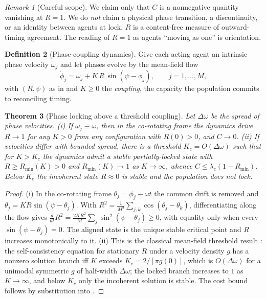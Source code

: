 \documentclass[11pt,a4paper]{article}
\theoremstyle{clstyle}
\newtheorem{theorem}{Theorem}[section]
\theoremstyle{definition}
\newtheorem{definition}[theorem]{Definition}
\theoremstyle{remark}
\newtheorem{remark}[theorem]{Remark}
\newcommand{\Ord}{R}
\newcommand{\Kc}{K_{c}}
\begin{document}
\begin{remark}[Careful scope]
\label{rem:phaselock-scope}
We claim only that $C$ is a nonnegative quantity vanishing at $\Ord=1$. We
do \emph{not} claim a physical phase transition, a discontinuity, or an
identity between agents at lock. $\Ord$ is a content-free measure of
outward-timing agreement. The reading of $\Ord=1$ as agents ``moving as one''
is orientation.
\end{remark}

\begin{definition}[Phase-coupling dynamics]
\label{def:kuramoto}
Give each acting agent an intrinsic phase velocity $\omega_j$ and let phases
evolve by the mean-field flow \citep{kuramoto1984chemical}
\[
\dot\phi_j=\omega_j+K\,\Ord\,\sin(\psi-\phi_j),\qquad j=1,\dots,M,
\]
with $(\Ord,\psi)$ as in  and $K\ge0$ the \emph{coupling},
the capacity the population commits to reconciling timing.
\end{definition}

\begin{theorem}[Phase locking above a threshold coupling]
\label{thm:kuramoto}
Let $\Delta\omega$ be the spread of phase velocities.
\textup{(i)} If $\omega_j\equiv\omega$, then in the co-rotating frame the
dynamics drive $\Ord\to1$ for any $K>0$ from any configuration with
$\Ord(0)>0$, and $C\to0$.
\textup{(ii)} If velocities differ with bounded spread, there is a threshold
$\Kc=O(\Delta\omega)$ such that for $K>\Kc$ the dynamics admit a stable
partially-locked state with $\Ord\ge\Ord_{\min}(K)>0$ and
$\Ord_{\min}(K)\to1$ as $K\to\infty$, whence $C\le\lambda_c(1-\Ord_{\min})$.
\emph{Below $\Kc$ the incoherent state $\Ord\approx0$ is stable and the
population does not lock.}
\end{theorem}

\begin{proof}
(i) In the co-rotating frame $\theta_j=\phi_j-\omega t$ the common drift is
removed and $\dot\theta_j=K\Ord\sin(\psi-\theta_j)$. With
$\Ord^2=\frac1{M^2}\sum_{j,k}\cos(\theta_j-\theta_k)$, differentiating along
the flow gives
$\frac{d}{dt}\Ord^2=\frac{2K\Ord^2}{M}\sum_j\sin^2(\psi-\theta_j)\ge0$,
with equality only when every $\sin(\psi-\theta_j)=0$. The aligned state is
the unique stable critical point and $\Ord$ increases monotonically to it.
(ii) This is the classical mean-field threshold result
\citep{strogatz2000kuramoto,acebron2005kuramoto,pikovsky2001synchronization}:
the self-consistency equation for stationary $\Ord$ under a velocity density
$g$ has a nonzero solution branch iff $K$ exceeds
$\Kc=2/[\pi g(0)]$, which is $O(\Delta\omega)$ for a unimodal symmetric $g$
of half-width $\Delta\omega$; the locked branch increases to $1$ as
$K\to\infty$, and below $\Kc$ only the incoherent solution is stable. The
cost bound follows by substitution into .
\end{proof}
\end{document}
